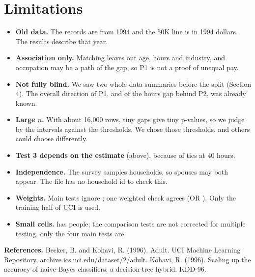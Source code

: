 \section{Limitations}
\begin{itemize}
  \item \textbf{Old data.} The records are from 1994 and the 50K line is in 1994 dollars. The results describe that year.
  \item \textbf{Association only.} Matching leaves out age, hours and industry, and occupation may be a path of the gap, so P1 is not a proof of unequal pay.
  \item \textbf{Not fully blind.} We saw two whole-data summaries before the split (Section 4). The overall direction of P1, and of the hours gap behind P2, was already known.
  \item \textbf{Large $n$.} With about 16{,}000 rows, tiny gaps give tiny p-values, so we judge by the intervals against the thresholds. We chose those thresholds, and others could choose differently.
  \item \textbf{Test 3 depends on the estimate} (above), because of ties at 40 hours.
  \item \textbf{Independence.} The survey samples households, so spouses may both appear. The file has no household id to check this.
  \item \textbf{Weights.} Main tests ignore ; one weighted check agrees (OR \TOneWOR). Only the training half of UCI is used.
  \item \textbf{Small cells.}  has \TFourNoPay{} people; the comparison tests are not corrected for multiple testing, only the four main tests are.
\end{itemize}

\small\textbf{References.} Becker, B. and Kohavi, R. (1996). Adult. UCI Machine Learning Repository, archive.ics.uci.edu/dataset/2/adult.
Kohavi, R. (1996). Scaling up the accuracy of naive-Bayes classifiers: a decision-tree hybrid. KDD-96.


